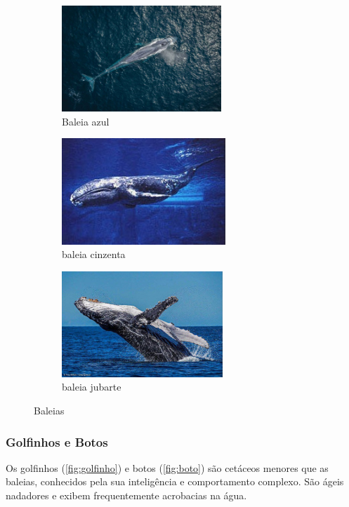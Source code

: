 \documentclass{report}
\begin{document}
\begin{figure}[H]
\center
    \begin{subfigure}{.5\textwidth}
    \center
        \includegraphics[height=4cm]{imagens/baleiaazul.jpg}
        \caption{Baleia azul}
        \label{fig:baleiaazul}
    \end{subfigure}%
    \hfill
    \begin{subfigure}{.5\textwidth}
    \center
        \includegraphics[height=4cm]{imagens/baleiacinzenta.jpg}
        \caption{baleia cinzenta}
        \label{fig:baleiacinzenta}
    \end{subfigure}%
    \hfill
    \begin{subfigure}{.5\textwidth}
    \center    
        \includegraphics[height=4cm]{imagens/jubarte.jpg}
        \caption{baleia jubarte}
        \label{fig:baleiajubarte}
    \end{subfigure}
    \caption{Baleias}
    \label{fig:baleias}
\end{figure}

\subsubsection{Golfinhos e Botos}
Os golfinhos (\ref{fig:golfinho}) e botos (\ref{fig:boto}) são cetáceos menores que as baleias, conhecidos pela sua inteligência e comportamento complexo. São ágeis nadadores e exibem frequentemente acrobacias na água.
\end{document}
